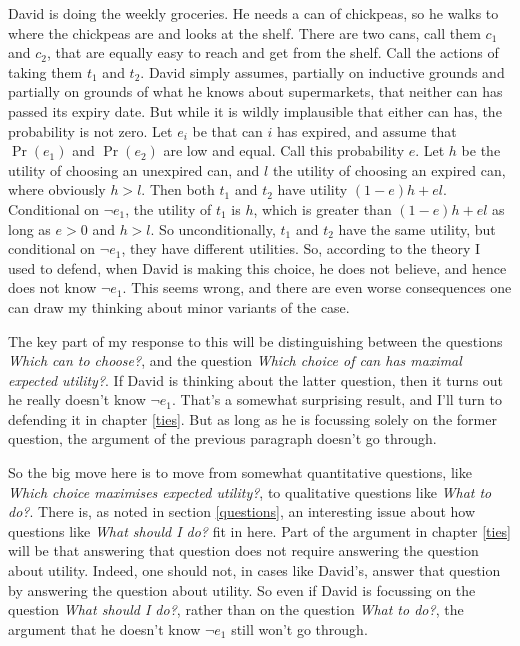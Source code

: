 \documentclass[11pt,]{book}
\begin{document}
David is doing the weekly groceries. He needs a can of chickpeas, so he walks to where the chickpeas are and looks at the shelf. There are two cans, call them \(c_1\) and \(c_2\), that are equally easy to reach and get from the shelf. Call the actions of taking them \(t_1\) and \(t_2\). David simply assumes, partially on inductive grounds and partially on grounds of what he knows about supermarkets, that neither can has passed its expiry date. But while it is wildly implausible that either can has, the probability is not zero. Let \(e_i\) be that can \(i\) has expired, and assume that \(\Pr(e_1)\) and \(\Pr(e_2)\) are low and equal. Call this probability \(e\). Let \(h\) be the utility of choosing an unexpired can, and \(l\) the utility of choosing an expired can, where obviously \(h > l\). Then both \(t_1\) and \(t_2\) have utility \((1-e)h + el\). Conditional on \(\neg e_1\), the utility of \(t_1\) is \(h\), which is greater than \((1-e)h + el\) as long as \(e > 0\) and \(h > l\). So unconditionally, \(t_1\) and \(t_2\) have the same utility, but conditional on \(\neg e_1\), they have different utilities. So, according to the theory I used to defend, when David is making this choice, he does not believe, and hence does not know \(\neg e_1\). This seems wrong, and there are even worse consequences one can draw my thinking about minor variants of the case.

The key part of my response to this will be distinguishing between the questions \emph{Which can to choose?}, and the question \emph{Which choice of can has maximal expected utility?}. If David is thinking about the latter question, then it turns out he really doesn't know \(\neg e_1\). That's a somewhat surprising result, and I'll turn to defending it in chapter \ref{ties}. But as long as he is focussing solely on the former question, the argument of the previous paragraph doesn't go through.

So the big move here is to move from somewhat quantitative questions, like \emph{Which choice maximises expected utility?}, to qualitative questions like \emph{What to do?}. There is, as noted in section \ref{questions}, an interesting issue about how questions like \emph{What should I do?} fit in here. Part of the argument in chapter \ref{ties} will be that answering that question does not require answering the question about utility. Indeed, one should not, in cases like David's, answer that question by answering the question about utility. So even if David is focussing on the question \emph{What should I do?}, rather than on the question \emph{What to do?}, the argument that he doesn't know \(\neg e_1\) still won't go through.
\end{document}

